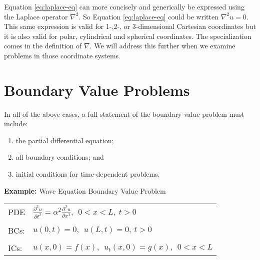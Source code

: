 Equation \ref{eq:laplace-eq} can more concisely and generically be expressed using the Laplace operator $\nabla^2$.
So Equation \ref{eq:laplace-eq} could be written $\nabla^2 u = 0$.  This same expression is valid for 1-,2-, or 3-dimensional Cartesian coordinates but it is also valid for polar, cylindrical and spherical coordinates.  The specialization comes in the definition of $\nabla$.  We will address this further when we examine problems in those coordinate systems.

\section{Boundary Value Problems}
In all of the above cases, a full statement of the boundary value problem must include:
\begin{enumerate}
\item the partial differential equation;
\item all boundary conditions; and
\item initial conditions for time-dependent problems.
\end{enumerate}

\vspace{0.5cm}

\noindent\textbf{Example:} Wave Equation Boundary Value Problem
\begin{table}
\begin{tabular}{l l}
PDE & $ \frac{\partial^2 u}{\partial t^2} = \alpha^2 \frac{\partial^2 u}{\partial x^2}, \ \ 0<x<L, \ t>0$\\
 & \\
BCs: & $u(0,t) = 0, \ \ u(L,t) = 0, \ t>0$ \\
 & \\
ICs: & $u(x,0)=f(x), \ \ u_t(x,0)=g(x), \ \ 0<x<L$ \\
\end{tabular}
\end{table}

